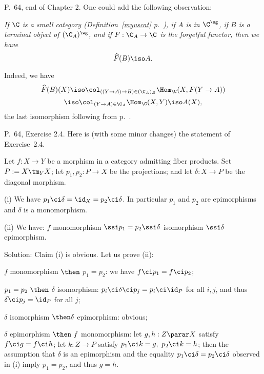 \documentclass[12pt]{article}
\theoremstyle{remark}
\theoremstyle{definition}
\begin{document}
%

\begin{s}
P.~64, end of Chapter 2. One could add the following observation: 

\emph{If $\C$ is a small category (Definition~\ref{myuscat} p.~), if $A$ is in $\C^\wg$, if $B$ is a terminal object of $(\C_A)^\wg$, and if $F:\C_A\to\C$ is the forgetful functor, then we have} 
$$
\widehat F(B)\iso A.
$$ 

Indeed, we have 
$$
\widehat F(B)(X)\iso\col_{((Y\to A)\to B)\in(\C_A)_B}\Hom_\C(X,F(Y\to A))
$$
$$
\iso\col_{(Y\to A)\in\C_A}\Hom_\C(X,Y)\iso A(X),
$$ 
the last isomorphism following from  p.~. 
\end{s}

%

\begin{s}
P.~64, Exercise 2.4. Here is (with some minor changes) the statement of Exercise~2.4. 

Let $f:X\to Y$ be a morphism in a category admitting fiber products. Set $P:=X\tm_YX$; let $p_1,p_2:P\to X$ be the projections; and let $\delta:X\to P$ be the diagonal morphism.

\nn(i) We have $p_1\ci\delta=\id_X=p_2\ci\delta$. In particular $p_1$ and $p_2$ are epimorphisms and $\delta$ is a monomorphism.

\nn(ii) We have: $f$ monomorphism $\ssi p_1=p_2\ssi\delta$ isomorphism $\ssi\delta$ epimorphism. %

Solution: Claim (i) is obvious. Let us prove (ii):

\nn $f$ monomorphism $\then$ $p_1=p_2$: we have $f\ci p_1=f\ci p_2$;

\nn$p_1=p_2\ \then$ $\delta$ isomorphism: $p_i\ci\delta\ci p_j=p_i\ci\id_P$ for all $i,j$, and thus $\delta\ci p_j=\id_P$ for all $j$;

\nn$\delta$ isomorphism $\then\delta$ epimorphism: obvious;

\nn$\delta$ epimorphism $\then\ f$ monomorphism: let $g,h:Z\parar X$ satisfy $f\ci g=f\ci h$; let $k:Z\to P$ satisfy $p_1\ci k=g,\ p_2\ci k=h$; %
then the assumption that $\delta$ is an epimorphism and the equality $p_1\ci\delta=p_2\ci\delta$ observed in (i) imply $p_1=p_2$, and thus $g=h$.
\end{s}

\end{document}
